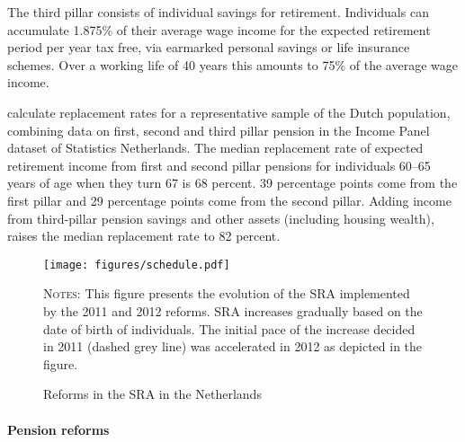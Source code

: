 \documentclass[12pt,a4paper]{article}
\begin{document}
The third pillar consists of individual savings for retirement. Individuals can accumulate 1.875\% of their average wage income for the expected retirement period per year tax free, via earmarked personal savings or life insurance schemes. Over a working life of 40 years this amounts to 75\% of the average wage income. 

\cite{knoef_et_al_2017} calculate replacement rates for a representative sample of the Dutch population, combining data on first, second and third pillar pension in the Income Panel dataset of Statistics Netherlands. The median replacement rate of expected retirement income from first and second pillar pensions for individuals 60--65 years of age when they turn 67 is 68 percent.%
39 percentage points come from the first pillar and 29 percentage points come from the second pillar. Adding income from third-pillar pension savings and other assets (including housing wealth), raises the median replacement rate to 82 percent.

\begin{figure}[!t]
\caption{Reforms in the SRA in the Netherlands}
\label{nra_reform}
	\centering
	\texttt{[image: figures/schedule.pdf]}
 	\begin{minipage}{15cm}%
  \footnotesize
	\textsc{Notes:}  This figure presents the evolution of the SRA implemented by the 2011 and 2012 reforms. SRA increases gradually based on the date of birth of individuals. The initial pace of the increase decided in 2011 (dashed grey line) was accelerated in 2012 as depicted in the figure.
	\end{minipage}%
\end{figure}

\paragraph{Pension reforms}
\end{document}
